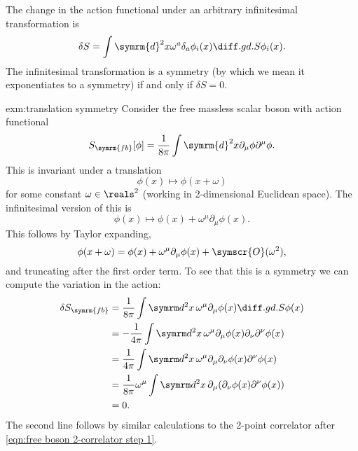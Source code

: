 \documentclass[fleqn]{NotesClass}
\renewcommand{\dl}[1]{\symrm{d}#1}
\newcommand{\freeboson}{\symrm{fb}}
\newcommand{\order}{\symscr{O}}
\begin{document}
    The change in the action functional under an arbitrary infinitesimal transformation is
    \begin{equation}
        \delta S = \int \dl{^2x} \omega^a \delta_a \phi_i(x) \diffd{S}{\phi_i(x)}.
    \end{equation}
    The infinitesimal transformation is a symmetry (by which we mean it exponentiates to a symmetry) if and only if \(\delta S = 0\).
    
    \begin{exm}{}{exm:translation symmetry}
        Consider the free massless scalar boson with action functional
        \begin{equation}
            S_{\freeboson}[\phi] = \frac{1}{8\pi}\int \dl{^2x} \partial_\mu \phi \partial^\mu \phi.
        \end{equation}
        This is invariant under a translation
        \begin{equation}
            \phi(x) \mapsto \phi(x + \omega)
        \end{equation}
        for some constant \(\omega \in \reals^2\) (working in 2-dimensional Euclidean space).
        The infinitesimal version of this is
        \begin{equation}
            \phi(x) \mapsto \phi(x) + \omega^\mu \partial_\mu \phi(x).
        \end{equation}
        This follows by Taylor expanding,
        \begin{equation}
            \phi(x + \omega) = \phi(x) + \omega^\mu \partial_\mu \phi(x) + \order(\omega^2),
        \end{equation}
        and truncating after the first order term.
        To see that this is a symmetry we can compute the variation in the action:
        \begin{align}
            \delta S_{\freeboson} &= \frac{1}{8\pi}\int \dl^2x \, \omega^\mu \partial_\mu \phi(x) \diffd{S}{\phi(x)}\\
            &= -\frac{1}{4\pi} \int \dl^2x \, \omega^\mu \partial_\mu \phi(x) \partial_\nu \partial^\nu \phi(x)\\
            &= \frac{1}{4\pi} \int \dl^2x \, \omega^\mu \partial_\mu \partial_\nu \phi(x) \partial^\nu \phi(x)\\
            &= \frac{1}{8\pi} \omega^\mu \int \dl^2x \, \partial_\mu (\partial_\nu \phi(x) \partial^\nu \phi(x))\\
            &= 0.
         \end{align}
         The second line follows by similar calculations to the 2-point correlator after \cref{eqn:free boson 2-correlator step 1}.

\end{exm}
\end{document}

